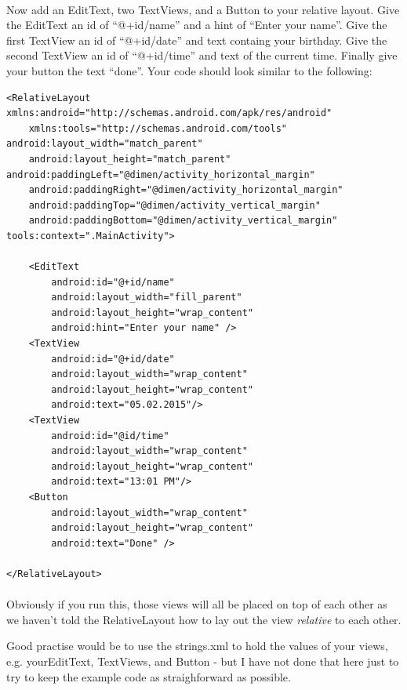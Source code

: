 \paragraph{} Now add an EditText, two TextViews, and a Button to your relative layout. Give the EditText an id of ``@+id/name'' and a hint of ``Enter your name''. Give the first TextView an id of ``@+id/date'' and text containg your birthday. Give the second TextView an id of ``@+id/time'' and text of the current time. Finally give your button the text ``done''. Your code should look similar to the following:

\begin{lstlisting}
<RelativeLayout xmlns:android="http://schemas.android.com/apk/res/android"
    xmlns:tools="http://schemas.android.com/tools" android:layout_width="match_parent"
    android:layout_height="match_parent" android:paddingLeft="@dimen/activity_horizontal_margin"
    android:paddingRight="@dimen/activity_horizontal_margin"
    android:paddingTop="@dimen/activity_vertical_margin"
    android:paddingBottom="@dimen/activity_vertical_margin" tools:context=".MainActivity">

    <EditText
        android:id="@+id/name"
        android:layout_width="fill_parent"
        android:layout_height="wrap_content"
        android:hint="Enter your name" />
    <TextView
        android:id="@+id/date"
        android:layout_width="wrap_content"
        android:layout_height="wrap_content"
        android:text="05.02.2015"/>
    <TextView
        android:id="@id/time"
        android:layout_width="wrap_content"
        android:layout_height="wrap_content"
        android:text="13:01 PM"/>
    <Button
        android:layout_width="wrap_content"
        android:layout_height="wrap_content"
        android:text="Done" />

</RelativeLayout>
\end{lstlisting}

\paragraph{} Obviously if you run this, those views will all be placed on top of each other as we haven't told the RelativeLayout how to lay out the view \emph{relative} to each other.

\begin{framed}
Good practise would be to use the strings.xml to hold the values of your views, e.g. yourEditText, TextViews, and Button - but I have not done that here just to try to keep the example code as straighforward as possible.
\end{framed}

